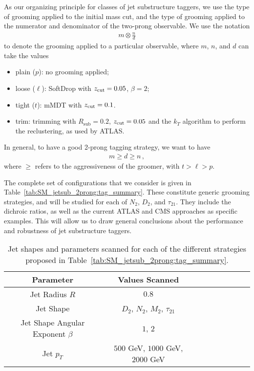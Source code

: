 As our organizing principle for classes of  jet substructure taggers, we use the type of grooming applied to the initial mass cut, and the type of grooming applied to the numerator and denominator of the two-prong observable.
%
We use the notation 
\begin{align}
m \otimes \frac{n}{d}
\end{align}
%
to denote the grooming applied to a particular observable, where $m$, $n$, and $d$ can take the values
%
\begin{itemize}
\item plain ($p$): no grooming applied;
\item loose ($\ell$): SoftDrop with ${z_{\rm cut}}=0.05$, $\beta=2$;
\item tight ($t$): mMDT with ${z_{\rm cut}}=0.1$.
\item trim: trimming with $R_{\text{sub}}=0.2$,  $ {z_{\rm cut}}=0.05$ and the $k_T$ algorithm to perform the reclustering, as used by ATLAS.
\end{itemize}
%
In general, to have a good 2-prong tagging strategy, we want to have
\begin{align}
m \geq d \geq n\,,
\end{align}
%
where $\geq$ refers to the aggressiveness of the groomer, with $t > \ell > p$.

The complete set of configurations that we consider is given in Table~\ref{tab:SM_jetsub_2prong:tag_summary}.
%
These constitute generic grooming strategies, and will be studied for each of $N_2$, $D_2$, and $\tau_{21}$.
%
They include the dichroic ratios, as well as the current ATLAS and CMS approaches as specific examples.
%
This will allow us to draw general conclusions about the performance and robustness of jet substructure taggers.


\begin{table}
\begin{center}
\begin{tabular}{| c | c | c |c |c|c|c |c|r| }
  \hline                       
  Parameter &  Values Scanned \\
  \hline
  Jet Radius $R$ &   $0.8$ \\
  Jet Shape  &   $D_2$, $N_2$, $M_2$, $\tau_{21}$  \\
  Jet Shape Angular Exponent $\beta$ &   $1$, $2$ \\
  Jet $p_T$ &   $500$ GeV, $1000$ GeV, $2000$ GeV  \\
  \hline  
\end{tabular}
\end{center}
\caption{
Jet shapes and parameters scanned for each of the different strategies proposed in Table~\ref{tab:SM_jetsub_2prong:tag_summary}. 
}
\label{tab:SM_jetsub_2prong:params}
\end{table}


